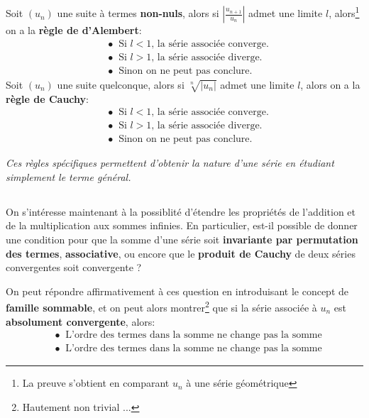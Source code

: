 \subsection*{}
Soit \((u_n)\) une suite à termes \textbf{non-nuls}, alors si \(|\frac{u_{n+1}}{u_n}|\) admet une limite \(l\), alors\footnote[5]{\label{1}La preuve s'obtient en comparant \(u_n\) à une série géométrique} on a la \textbf{règle de d'Alembert}:
\begin{align*}
   &\bullet \;\; \text{Si \(l < 1\), la série associée converge.} \\
   &\bullet \;\; \text{Si \(l > 1\), la série associée diverge.} \\
   &\bullet \;\; \text{Sinon on ne peut pas conclure.}
\end{align*}
Soit \((u_n)\) une suite quelconque, alors si \(\sqrt[n]{|u_{n}|}\) admet une limite \(l\), alors on a la \textbf{règle de Cauchy}:
\begin{align*}
   &\bullet \;\; \text{Si \(l < 1\), la série associée converge.} \\
   &\bullet \;\; \text{Si \(l > 1\), la série associée diverge.} \\
   &\bullet \;\; \text{Sinon on ne peut pas conclure.}
\end{align*}
\begin{center}
   \textit{Ces règles spécifiques permettent d'obtenir la nature d'une série en étudiant simplement le terme général.}
\end{center}

\pagebreak
\subsection*{}
On s'intéresse maintenant à la possiblité d'étendre les propriétés de l'addition et de la multiplication aux sommes infinies. En particulier, est-il possible de donner une condition pour que la somme d'une série soit \textbf{invariante par permutation des termes}, \textbf{associative}, ou encore que le \textbf{produit de Cauchy} de deux séries convergentes soit convergente ?\<

On peut répondre affirmativement à ces question en introduisant le concept de \textbf{famille sommable}, et on peut alors montrer\footnote[6]{Hautement non trivial ...} que si la série associée à \(u_n\) est \textbf{absolument convergente}, alors:
\begin{align*}
   &\bullet \;\; \text{L'ordre des termes dans la somme ne change pas la somme} \\
   &\bullet \;\; \text{L'ordre des termes dans la somme ne change pas la somme}
\end{align*}
